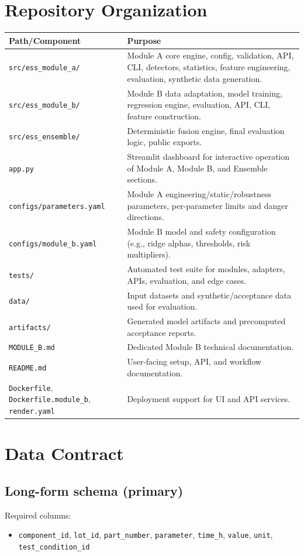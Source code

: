 \documentclass[11pt]{article}
\begin{document}
\section{Repository Organization}

\begin{longtable}{p{}p{}}
\toprule
\textbf{Path/Component} & \textbf{Purpose} \\
\midrule
\texttt{src/ess\_module\_a/} & Module A core engine, config, validation, API, CLI, detectors, statistics, feature engineering, evaluation, synthetic data generation. \\
\texttt{src/ess\_module\_b/} & Module B data adaptation, model training, regression engine, evaluation, API, CLI, feature construction. \\
\texttt{src/ess\_ensemble/} & Deterministic fusion engine, final evaluation logic, public exports. \\
\texttt{app.py} & Streamlit dashboard for interactive operation of Module A, Module B, and Ensemble sections. \\
\texttt{configs/parameters.yaml} & Module A engineering/static/robustness parameters, per-parameter limits and danger directions. \\
\texttt{configs/module\_b.yaml} & Module B model and safety configuration (e.g., ridge alphas, thresholds, risk multipliers). \\
\texttt{tests/} & Automated test suite for modules, adapters, APIs, evaluation, and edge cases. \\
\texttt{data/} & Input datasets and synthetic/acceptance data used for evaluation. \\
\texttt{artifacts/} & Generated model artifacts and precomputed acceptance reports. \\
\texttt{MODULE\_B.md} & Dedicated Module B technical documentation. \\
\texttt{README.md} & User-facing setup, API, and workflow documentation. \\
\texttt{Dockerfile}, \texttt{Dockerfile.module\_b}, \texttt{render.yaml} & Deployment support for UI and API services. \\
\bottomrule
\end{longtable}

\section{Data Contract}

\subsection{Long-form schema (primary)}
Required columns:
\begin{itemize}[nosep]
  \item \texttt{component\_id}, \texttt{lot\_id}, \texttt{part\_number}, \texttt{parameter}, \texttt{time\_h}, \texttt{value}, \texttt{unit}, \texttt{test\_condition\_id}
\end{itemize}
\end{document}
